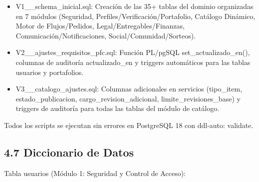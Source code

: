 \documentclass[
]{article}
\begin{document}
\begin{itemize}
\item
  V1\_\_schema\_inicial.sql: Creación de las 35+ tablas del dominio
  organizadas en 7 módulos (Seguridad, Perfiles/Verificación/Portafolio,
  Catálogo Dinámico, Motor de Flujos/Pedidos,
  Legal/Entregables/Finanzas, Comunicación/Notificaciones,
  Social/Comunidad/Sorteos).
\item
  V2\_\_ajustes\_requisitos\_pfc.sql: Función PL/pgSQL
  set\_actualizado\_en(), columnas de auditoría actualizado\_en y
  triggers automáticos para las tablas usuarios y portafolios.
\item
  V3\_\_catalogo\_ajustes.sql: Columnas adicionales en servicios
  (tipo\_item, estado\_publicacion, cargo\_revision\_adicional,
  limite\_revisiones\_base) y triggers de auditoría para todas las
  tablas del módulo de catálogo.
\end{itemize}

Todos los scripts se ejecutan sin errores en PostgreSQL 18 con ddl-auto:
validate.

\subsection{4.7 Diccionario de Datos}

Tabla usuarios (Módulo 1: Seguridad y Control de Acceso):
\end{document}

